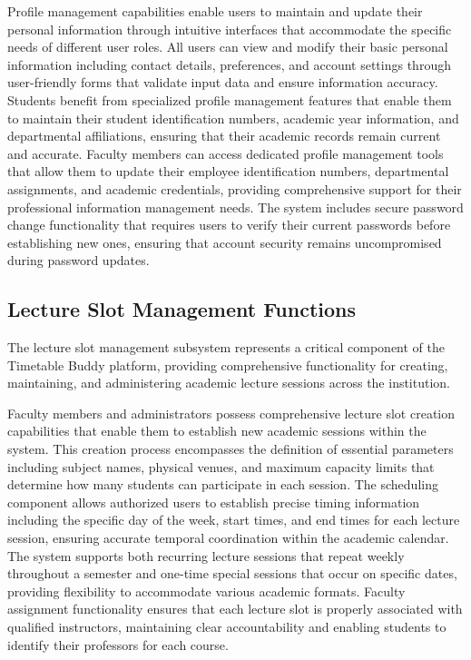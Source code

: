 Profile management capabilities enable users to maintain and update their personal information through intuitive interfaces that accommodate the specific needs of different user roles. All users can view and modify their basic personal information including contact details, preferences, and account settings through user-friendly forms that validate input data and ensure information accuracy. Students benefit from specialized profile management features that enable them to maintain their student identification numbers, academic year information, and departmental affiliations, ensuring that their academic records remain current and accurate. Faculty members can access dedicated profile management tools that allow them to update their employee identification numbers, departmental assignments, and academic credentials, providing comprehensive support for their professional information management needs. The system includes secure password change functionality that requires users to verify their current passwords before establishing new ones, ensuring that account security remains uncompromised during password updates.

\subsection{Lecture Slot Management Functions}

The lecture slot management subsystem represents a critical component of the Timetable Buddy platform, providing comprehensive functionality for creating, maintaining, and administering academic lecture sessions across the institution.

Faculty members and administrators possess comprehensive lecture slot creation capabilities that enable them to establish new academic sessions within the system. This creation process encompasses the definition of essential parameters including subject names, physical venues, and maximum capacity limits that determine how many students can participate in each session. The scheduling component allows authorized users to establish precise timing information including the specific day of the week, start times, and end times for each lecture session, ensuring accurate temporal coordination within the academic calendar. The system supports both recurring lecture sessions that repeat weekly throughout a semester and one-time special sessions that occur on specific dates, providing flexibility to accommodate various academic formats. Faculty assignment functionality ensures that each lecture slot is properly associated with qualified instructors, maintaining clear accountability and enabling students to identify their professors for each course.

